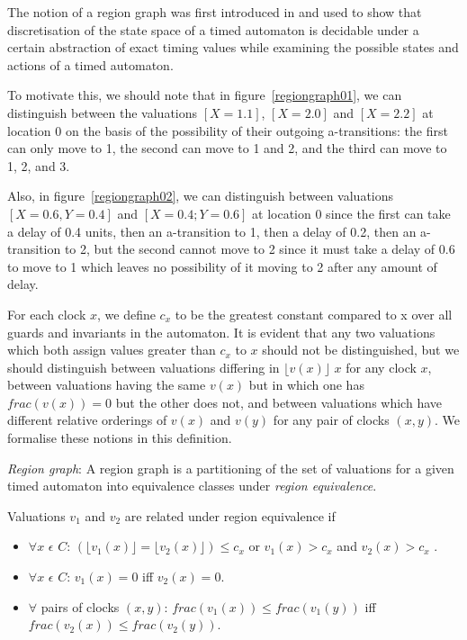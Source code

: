 The notion of a region graph was first introduced in
\cite{Alur94atheory} and used to show that discretisation of the state
space of a timed automaton is decidable under a certain abstraction of
exact timing values while examining the possible states and actions of
a timed automaton.

To motivate this, we should note that in figure~\ref{regiongraph01}, we can distinguish
between the valuations $[X = 1.1]$, $[X = 2.0]$ and $[X = 2.2]$ at
location 0 on the
basis of the possibility of their outgoing a-transitions: the first can
only move to 1, the second can move to 1 and 2, and the third can move
to 1, 2, and 3.

Also, in figure~\ref{regiongraph02}, we can distinguish between
valuations $[X = 0.6, Y = 0.4]$ and $[X = 0.4; Y = 0.6]$ at location 0
since the first can take a delay of 0.4 units, then an a-transition to
1, then a delay of 0.2, then an a-transition to 2, but the second
cannot move to 2 since it must take a delay of 0.6 to move to 1 which
leaves no possibility of it moving to 2 after any amount of delay.

For each clock $x$, we define $c_x$ to be the
greatest constant compared to x over all guards and invariants in the
automaton. It is evident that any two valuations which both assign
values greater than $c_x$ to $x$ should not be distinguished, but we should
distinguish between valuations differing in $\lfloor v(x)\rfloor$ $x$
for any clock $x$, between valuations having the same $v(x)$
but in which one has $frac(v(x))=0$ but the other does not,
and between valuations which have different relative orderings of
$v(x)$ and $v(y)$ for any pair of clocks $(x, y)$. We formalise these
notions in this definition.

\begin{definition}
  \emph{Region graph}: A region graph is a partitioning of the set of
  valuations for a given timed automaton into equivalence
  classes under \emph{region equivalence}.

  Valuations $v_1$ and $v_2$ are related under region equivalence if 
  \begin{itemize}
    \item $\forall x$ $\epsilon$ $C$: $(\lfloor v_1(x) \rfloor = \lfloor
      v_2(x) \rfloor) \leq c_x$ or $v_1(x) > c_x$ and $v_2(x) > c_x$ .
    \item $\forall x$ $\epsilon$ $C$: $v_1(x) = 0$ iff $v_2(x) = 0$.
    \item $\forall$ pairs of clocks $(x, y)$: $frac(v_1(x)) \leq
      frac(v_1(y))$ iff $frac(v_2(x)) \leq frac(v_2(y))$.
  \end{itemize}
\end{definition}

